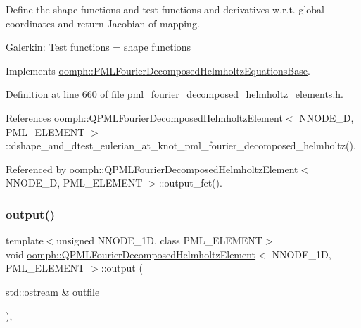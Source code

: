 Define the shape functions and test functions and derivatives w.\+r.\+t. global coordinates and return Jacobian of mapping.

Galerkin\+: Test functions = shape functions 

Implements \hyperlink{classoomph_1_1PMLFourierDecomposedHelmholtzEquationsBase_ac00e3f75197b37ff99a343b88b36284f}{oomph\+::\+P\+M\+L\+Fourier\+Decomposed\+Helmholtz\+Equations\+Base}.



Definition at line 660 of file pml\+\_\+fourier\+\_\+decomposed\+\_\+helmholtz\+\_\+elements.\+h.



References oomph\+::\+Q\+P\+M\+L\+Fourier\+Decomposed\+Helmholtz\+Element$<$ N\+N\+O\+D\+E\+\_\+D, P\+M\+L\+\_\+\+E\+L\+E\+M\+E\+N\+T $>$\+::dshape\+\_\+and\+\_\+dtest\+\_\+eulerian\+\_\+at\+\_\+knot\+\_\+pml\+\_\+fourier\+\_\+decomposed\+\_\+helmholtz().



Referenced by oomph\+::\+Q\+P\+M\+L\+Fourier\+Decomposed\+Helmholtz\+Element$<$ N\+N\+O\+D\+E\+\_\+D, P\+M\+L\+\_\+\+E\+L\+E\+M\+E\+N\+T $>$\+::output\+\_\+fct().

\mbox{\label{classoomph_1_1QPMLFourierDecomposedHelmholtzElement_a27085df03fa3b5bc7a0bf02cd18808ed}} 
\subsubsection{\texorpdfstring{output()}{output()}\hspace{0.1cm}{\footnotesize\ttfamily [1/4]}}
{\footnotesize\ttfamily template$<$unsigned N\+N\+O\+D\+E\+\_\+1D, class P\+M\+L\+\_\+\+E\+L\+E\+M\+E\+NT$>$ \\
void \hyperlink{classoomph_1_1QPMLFourierDecomposedHelmholtzElement}{oomph\+::\+Q\+P\+M\+L\+Fourier\+Decomposed\+Helmholtz\+Element}$<$ N\+N\+O\+D\+E\+\_\+1D, P\+M\+L\+\_\+\+E\+L\+E\+M\+E\+NT $>$\+::output (\begin{DoxyParamCaption}\item[{std\+::ostream \&}]{outfile }\end{DoxyParamCaption})\hspace{0.3cm}{\ttfamily [inline]}, {\ttfamily [virtual]}}



